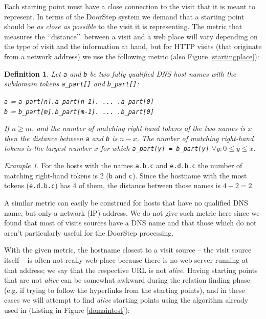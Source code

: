 \documentclass[a4paper,twoside]{danarticle}
\newtheorem{definition}{Definition}
\theoremstyle{remark}
\newtheorem*{example}{Example}
\begin{document}
       Each starting point must have a close connection to the visit that it is
       meant to represent. In terms of the DoorStep system we demand that a
       starting point should be \textit{as close as possible} to the visit it is
       representing. The metric that measures the \lq\lq distance\rq\rq\ between
       a visit and a web place will vary depending on the type of visit and the
       information at hand, but for HTTP visits (that originate from a network
       address) we use the following metric (also Figure \ref{startingplace}):
       \begin{definition}
       \label{metric}
       Let \verb$a$ and \verb$b$ be two fully qualified DNS host names with the
       subdomain tokens \verb$a_part[]$ and \verb$b_part[]$:
       \begin{center}
        \verb$a$ = \verb$a_part[n].a_part[n-1]. ... .a_part[0]$\\
        \verb$b$ = \verb$b_part[m].b_part[m-1]. ... .b_part[0]$\\ 
       \end{center}
       If $ n \geq m $, and the number of matching right-hand tokens of the two
       names is $ x $ then the distance between \verb$a$ and \verb$b$ is 
       $ n - x $. The number of matching right-hand tokens is the largest number
       $ x $ for which \verb$a_part[y] = b_part[y]$ $ \forall y : 0 \leq y \leq x $.
       \end{definition}
       \begin{example}
       For the hosts with the names \verb$a.b.c$ and \verb$e.d.b.c$  the number
       of matching right-hand tokens is 2 (\verb$b$ and \verb$c$). Since the
       hostname with the most tokens (\verb$e.d.b.c$) has 4 of them, the distance
       between those names is $ 4 - 2 = 2 $.
       \end{example}
       A similar metric can easily be construed for hosts that have no
       qualified DNS name, but only a network (IP) address. We do not give such
       metric here since we found that most of visits sources have a DNS name
       and that those which do not aren't particularly useful for the DoorStep
       processing.
       
       With the given metric, the hostname closest to a
       visit source -- the visit source itself -- 
       is often not really web place because there is no web server
       running at that address; we say that the respective URL is not
       \textit{alive}. Having starting points that are not \textit{alive} can
       be somewhat awkward during the relation finding phase (e.g. if trying to
       follow the hyperlinks from the starting points), and in these cases we
       will attempt to find \textit{alive} starting points using the algorithm
       already used in \cite{webaware} (Listing in Figure \ref{domaintest}):
       
\end{document}
